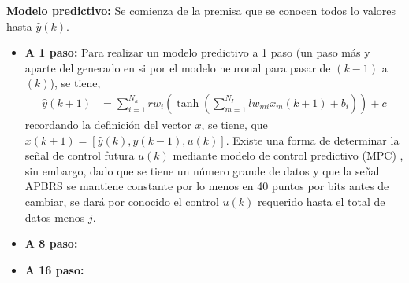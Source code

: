 \documentclass[12pt]{article}
\begin{document}
\textbf{Modelo predictivo:}
	Se comienza de la premisa que se conocen todos lo valores hasta $\hat{y}(k)$.
\begin{itemize}
	\item \textbf{A 1 paso:} 
	Para realizar un modelo predictivo a 1 paso (un paso más y aparte del generado en si por el modelo neuronal para pasar de $(k-1)$ a $(k)$), se tiene,
	\begin{align}
	\hat{y}(k+1) &= \sum_{i=1}^{N_h} rw_i \left( \tanh\left(\sum_{m=1}^{N_I} lw_{mi} x_{m}(k + 1) + b_i\right)\right) + c
	\label{mat_red_j}
	\end{align}
	recordando la definición del vector $x$, se tiene, que $x(k+1) = [\hat{y}(k), y(k-1), u(k)]$. Existe una forma de determinar la señal de control futura $u(k)$ mediante modelo de control predictivo (MPC) \cite{norgaard_neural_2000}, sin embargo, dado que se tiene un número grande de datos y que la señal APBRS se mantiene constante por lo menos en 40 puntos por bits antes de cambiar, se dará por conocido el control $u(k)$ requerido hasta el total de datos menos $j$. 
	
	 
	\item \textbf{A 8 paso:}
	\item \textbf{A 16 paso:}
\end{itemize}
\end{document}

